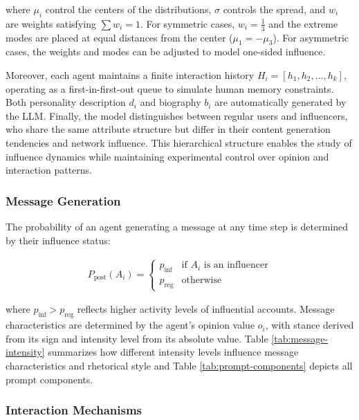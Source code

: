 where $\mu_i$ control the centers of the distributions, $\sigma$ controls the spread, and $w_i$ are weights satisfying $\sum w_i = 1$. For symmetric cases, $w_i = \frac{1}{3}$ and the extreme modes are placed at equal distances from the center ($\mu_1 = -\mu_3$). For asymmetric cases, the weights and modes can be adjusted to model one-sided influence.

Moreover, each agent maintains a finite interaction history $H_i = [h_1, h_2, ..., h_k]$, operating as a first-in-first-out queue to simulate human memory constraints. Both personality description $d_i$ and biography $b_i$ are automatically generated by the LLM. Finally, the model distinguishes between regular users and influencers, who share the same attribute structure but differ in their content generation tendencies and network influence. This hierarchical structure enables the study of influence dynamics while maintaining experimental control over opinion and interaction patterns.

\subsubsection{Message Generation}
\label{subsec:message-generation}

The probability of an agent generating a message at any time step is determined by their influence status:

\begin{align}
P_{\text{post}}(A_i) = \begin{cases}
p_{\text{inf}} & \text{if } A_i \text{ is an influencer} \\
p_{\text{reg}} & \text{otherwise}
\end{cases}
\end{align}


where $p_{\text{inf}} > p_{\text{reg}}$ reflects higher activity levels of influential accounts. Message characteristics are determined by the agent's opinion value $o_i$, with stance derived from its sign and intensity level from its absolute value.  Table \ref{tab:message-intensity} summarizes how different intensity levels influence message characteristics and rhetorical style and Table \ref{tab:prompt-components} depicts all prompt components.

\subsubsection{Interaction Mechanisms}
\label{subsec:interaction-mechanisms} 

